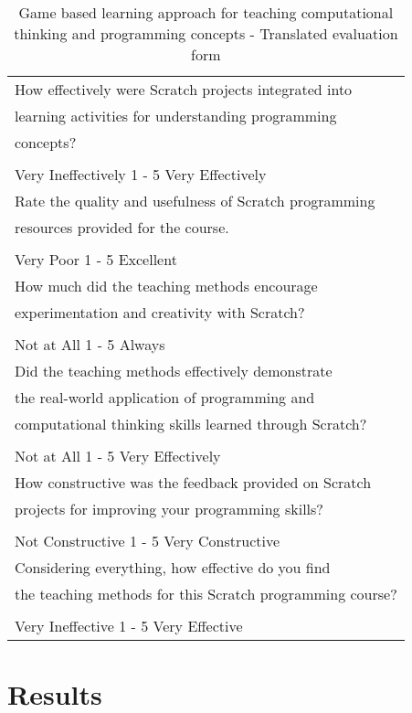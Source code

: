 \documentclass[final,5p,times,twocolumn,authoryear]{elsarticle}
\begin{document}
\begin{table}
\begin{tabular}{l} 
\hline
How effectively were Scratch projects integrated into \\
learning activities for understanding programming \\
concepts? \\\\
Very Ineffectively 1 - 5 Very Effectively\\
\hline
Rate the quality and usefulness of Scratch programming \\
resources provided for the course. \\\\
Very Poor 1 - 5 Excellent\\
 \hline
How much did the teaching methods encourage \\
experimentation and creativity with Scratch? \\\\
Not at All 1 - 5 Always\\
\hline
Did the teaching methods effectively demonstrate \\
the real-world application of programming and \\
computational thinking skills learned through Scratch? \\\\
Not at All 1 - 5 Very Effectively\\
 \hline
How constructive was the feedback provided on Scratch \\
projects for improving your programming skills? \\\\
Not Constructive 1 - 5 Very Constructive\\
\hline
Considering everything, how effective do you find \\
the teaching methods for this Scratch programming course? \\\\
Very Ineffective 1 - 5 Very Effective\\
 \hline
\end{tabular}
\caption{Game based learning approach for teaching computational thinking and programming concepts - Translated evaluation form
}
\label{Game based learning approach for teaching computational thinking and programming concepts - Translated evaluation form}
\end{table}


\section{Results}
\end{document}
